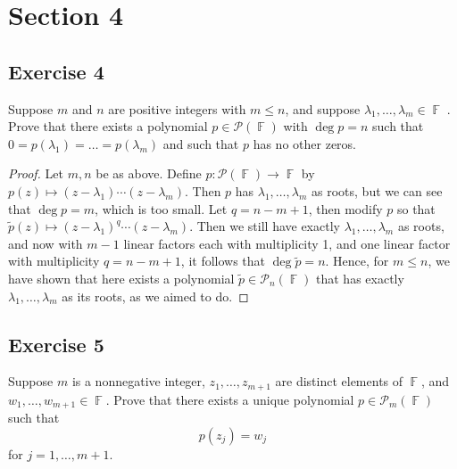 \documentclass[letterpaper, 12pt]{amsart}
\DeclareMathOperator{\F}{\mathbb{F}}				%
\theoremstyle{definition}  							%
\begin{document}
	\section*{Section 4}
		\subsection*{Exercise 4}
		Suppose $m$ and $n$ are positive integers with $m \leq n$, and suppose $\lambda_{1}, \dots, \lambda_{m} \in \F$􏰃. 
		Prove that there exists a polynomial $p \in \mathcal{P}(\F)$ with $\deg p = n$ such that $0 = p(\lambda_{1}) = \dots = p(\lambda_{m})$ and such that $p$ has no other zeros.

		\begin{proof}
		Let $m,n$ be as above.
		Define $p: \mathcal{P}(\F) \to \F$ by $p(z) \mapsto (z - \lambda_{1})\cdots(z - \lambda_{m})$.
		Then $p$ has $\lambda_{1}, \dots, \lambda_{m}$ as roots, but we can see that $\deg p = m$, which is too small.
		Let $q = n-m+1$, then modify $p$ so that $\tilde{p}(z) \mapsto (z - \lambda_{1})^{q} \cdots (z - \lambda_{m})$.
		Then we still have exactly $\lambda_{1}, \dots, \lambda_{m}$ as roots, and now with $m-1$ linear factors each with multiplicity 1, and one linear factor with multiplicity $q = n-m+1$, it follows that $\deg \tilde{p} = n$.
		Hence, for $m \leq n$, we have shown that here exists a polynomial $\tilde{p} \in \mathcal{P}_{n}(\F)$ that has exactly $\lambda_{1}, \dots, \lambda_{m}$ as its roots, as we aimed to do.
		\end{proof}

		\subsection*{Exercise 5}
		Suppose $m$ is a nonnegative integer, $z_{1}, \dots, z_{m+1}$ are distinct elements of $\F$, and $w_{1}, \dots, w_{m+1} \in \F$.
		Prove that there exists a unique polynomial $p \in \mathcal{P}_{m}(\F)$ such that $$p(z_{j}) = w_{j}$$ for $j = 1, \dots, m+1$.
\end{document}
